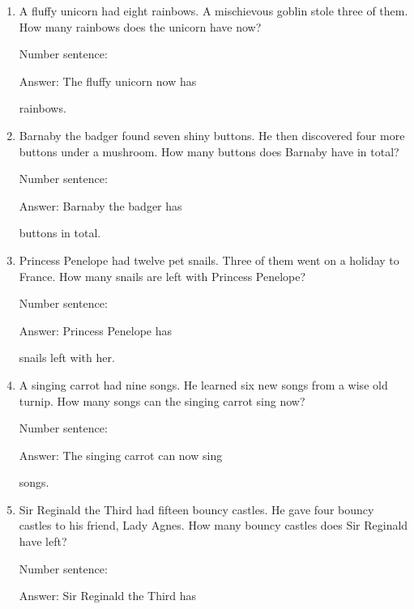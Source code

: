 \documentclass{tufte-book}
\begin{document}
\begin{enumerate}

\item
  A fluffy unicorn had eight rainbows. A mischievous goblin stole three
  of them. How many rainbows does the unicorn have now?\medskip\par
  Number sentence:
  \dotfill\medskip\par
  Answer: The fluffy unicorn now has
  \dotfill\medskip\par\mbox{}\dotfill\medskip\par\mbox{}\dotfill\bigskip
  rainbows.
\item
  Barnaby the badger found seven shiny buttons. He then discovered four
  more buttons under a mushroom. How many buttons does Barnaby have in
  total?\medskip\par
  Number sentence:
  \dotfill\medskip\par
  Answer: Barnaby the badger has
  \dotfill\medskip\par\mbox{}\dotfill\medskip\par\mbox{}\dotfill\bigskip
  buttons in total.
\item
  Princess Penelope had twelve pet snails. Three of them went on a
  holiday to France. How many snails are left with Princess Penelope?\medskip\par
  Number sentence:
  \dotfill\medskip\par
  Answer: Princess Penelope has
  \dotfill\medskip\par\mbox{}\dotfill\medskip\par\mbox{}\dotfill\bigskip
  snails left with her.
\item
  A singing carrot had nine songs. He learned six new songs from a wise
  old turnip. How many songs can the singing carrot sing now?\medskip\par
  Number sentence:
  \dotfill\medskip\par
  Answer: The singing carrot can now sing
  \dotfill\medskip\par\mbox{}\dotfill\medskip\par\mbox{}\dotfill\bigskip
  songs.
\item
  Sir Reginald the Third had fifteen bouncy castles. He gave four bouncy
  castles to his friend, Lady Agnes. How many bouncy castles does Sir
  Reginald have left?\medskip\par
  Number sentence:
  \dotfill\medskip\par
  Answer: Sir Reginald the Third has
  \dotfill\medskip\par\mbox{}\dotfill\medskip\par\mbox{}\dotfill\bigskip

\end{enumerate}
\end{document}
